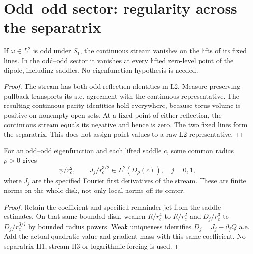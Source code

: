 \section{Odd--odd sector: regularity across the separatrix}

\begin{lemma}
\label{lem:continuous-stream-zero-separatrix}
\leanok
If $\omega\in L^2$ is odd under $S_1$, the continuous stream vanishes
on the lifts of its fixed lines. In the odd--odd sector it vanishes at
every lifted zero-level point of the dipole, including saddles.
No eigenfunction hypothesis is needed.
\end{lemma}

\begin{proof}
\leanok
The stream has both odd reflection identities in L2.
Measure-preserving pullback transports its a.e. agreement with the continuous
representative. The resulting continuous parity identities hold everywhere,
because torus volume is positive on nonempty open sets.
At a fixed point of either reflection, the continuous stream equals its
negative and hence is zero. The two fixed lines form the separatrix.
This does not assign point values to a raw L2 representative.
\end{proof}

\begin{lemma}
\label{lem:dd-saddle-forcing-mass}
\leanok
For an odd--odd eigenfunction and each lifted saddle $c$, some common
radius $\rho>0$ gives
\[
 \psi/r_c^2,\qquad J_j/r_c^{3/2}\in L^2(D_\rho(c)),\quad j=0,1,
\]
where $J_j$ are the specified Fourier first derivatives of the stream.
These are finite norms on the whole disk, not only local norms off its center.
\end{lemma}

\begin{proof}
\leanok
Retain the coefficient and specified remainder jet from the saddle estimates.
On that same bounded disk, weaken $R/r_c^4$ to $R/r_c^2$ and
$D_j/r_c^3$ to $D_j/r_c^{3/2}$ by bounded radius powers.
Weak uniqueness identifies $D_j=J_j-\partial_jQ$ a.e.
Add the actual quadratic value and gradient mass with this same coefficient.
No separatrix H1, stream H3 or logarithmic forcing is used.
\end{proof}


